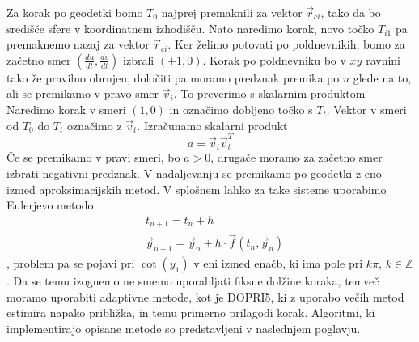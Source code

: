 \documentclass[titlepage]{article}
\begin{document}
Za korak po geodetki bomo \( T_{0} \) najprej premaknili za vektor \( \vec{r}_{ci} \), tako da bo središče sfere v koordinatnem izhodišču. Nato naredimo
korak, novo točko \( T_{i1} \) pa premaknemo nazaj za vektor \( \vec{r}_{ci} \).
Ker želimo potovati po poldnevnikih, bomo za začetno smer \(\left( \frac{du}{dt}, \frac{dv}{dt} \right) \) izbrali \(\left( \pm1, 0 \right) \). Korak po poldnevniku bo v \( xy \) ravnini tako že pravilno obrnjen, določiti pa moramo predznak premika po \( u \) glede na to, ali se premikamo v pravo smer \( \vec{v}_{i} \). To preverimo s skalarnim produktom
\bigskip
\newline
Naredimo korak v smeri \(\left( 1, 0 \right) \) in označimo dobljeno točko s \( T_{t} \). Vektor v smeri od \( T_{0} \) do \( T_{t} \) označimo z \( \vec{v}_{t} \).
Izračunamo skalarni produkt
\begin{equation} \label{e:dirCorr}
    a= \vec{v}_{i} \vec{v}_{t}^T
\end{equation}
Če se premikamo v pravi smeri, bo \( a > 0 \), drugače moramo za začetno smer izbrati negativni predznak.
\bigskip
\newline
V nadaljevanju se premikamo po geodetki z eno izmed aproksimacijskih metod. V splošnem lahko za take sisteme uporabimo Eulerjevo metodo
\begin{equation} \label{e:euler}
    \begin{split}
        &t_{n+1}=t_{n}+h \\
        &\vec{y}_{n+1}=\vec{y}_{n}+h \cdot \vec{f}(t_{n}, \vec{y}_{n})
    \end{split}
\end{equation},
problem pa se pojavi pri \( \cot(y_{1}) \) v eni izmed enačb, ki ima pole pri
\( k\pi \), \( k \in \mathbb{Z} \). Da se temu izognemo ne smemo uporabljati fiksne dolžine koraka, temveč moramo uporabiti adaptivne metode, kot je DOPRI5,
ki z uporabo večih metod estimira napako približka, in temu primerno prilagodi korak.
\bigskip
\newline
Algoritmi, ki implementirajo opisane metode so predstavljeni v naslednjem poglavju.
\newpage
\end{document}
